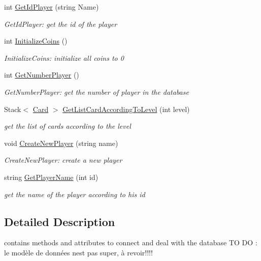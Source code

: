\begin{DoxyCompactItemize}
int \hyperlink{class_splendor_1_1_connection_d_b_a40b90ca2728a9ee2aa851f946c46181e}{Get\+Id\+Player} (string Name)
\begin{DoxyCompactList}\small\item\em Get\+Id\+Player\+: get the id of the player \end{DoxyCompactList}\item 
int \hyperlink{class_splendor_1_1_connection_d_b_a0174e48615ac3221e92da2e044ca57b6}{Initialize\+Coins} ()
\begin{DoxyCompactList}\small\item\em Initialize\+Coins\+: initialize all coins to 0 \end{DoxyCompactList}\item 
int \hyperlink{class_splendor_1_1_connection_d_b_a59283e3daafb9028e5334f9c32759d23}{Get\+Number\+Player} ()
\begin{DoxyCompactList}\small\item\em Get\+Number\+Player\+: get the number of player in the database \end{DoxyCompactList}\item 
Stack$<$ \hyperlink{class_splendor_1_1_card}{Card} $>$ \hyperlink{class_splendor_1_1_connection_d_b_abcd995d0fa97aa5f3a40ff5c23b22502}{Get\+List\+Card\+According\+To\+Level} (int level)
\begin{DoxyCompactList}\small\item\em get the list of cards according to the level \end{DoxyCompactList}\item 
void \hyperlink{class_splendor_1_1_connection_d_b_a190accacd0b0e2186dd0d8ab7d59076d}{Create\+New\+Player} (string name)
\begin{DoxyCompactList}\small\item\em Create\+New\+Player\+: create a new player \end{DoxyCompactList}\item 
string \hyperlink{class_splendor_1_1_connection_d_b_a7d715d5452049ad06f4a407fa5df151c}{Get\+Player\+Name} (int id)
\begin{DoxyCompactList}\small\item\em get the name of the player according to his id \end{DoxyCompactList}\end{DoxyCompactItemize}


\subsection{Detailed Description}
contains methods and attributes to connect and deal with the database TO DO \+: le modèle de données n\textquotesingle{}est pas super, à revoir!!!! 



